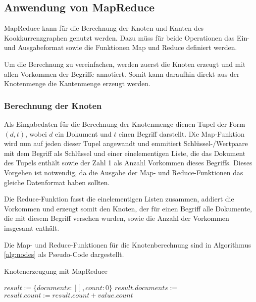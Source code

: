 \subsection{Anwendung von MapReduce}
\label{mapreduce_cooccurence}

MapReduce kann für die Berechnung der Knoten und Kanten des Kookkurrenzgraphen genutzt werden. Dazu müss für beide Operationen das Ein- und Ausgabeformat sowie die Funktionen Map und Reduce definiert werden.

Um die Berechnung zu vereinfachen, werden zuerst die Knoten erzeugt und mit allen Vorkommen der Begriffe annotiert. Somit kann daraufhin direkt aus der Knotenmenge die Kantenmenge erzeugt werden.

\subsubsection{Berechnung der Knoten}

Als Eingabedaten für die Berechnung der Knotenmenge dienen Tupel der Form \((d, t)\), wobei \(d\) ein Dokument und \(t\) einen Begriff darstellt. Die Map-Funktion wird nun auf jeden dieser Tupel angewandt und emmitiert Schlüssel-/Wertpaare mit dem Begriff als Schlüssel und einer einelementigen Liste, die das Dokument des Tupels enthält sowie der Zahl \num{1} als Anzahl Vorkommen dieses Begriffs. Dieses Vorgehen ist notwendig, da die Ausgabe der Map- und Reduce-Funktionen das gleiche Datenformat haben sollten.

Die Reduce-Funktion fasst die einelementigen Listen zusammen, addiert die Vorkommen und erzeugt somit den Knoten, der für einen Begriff alle Dokumente, die mit diesem Begriff versehen wurden, sowie die Anzahl der Vorkommen insgesamt enthält.

Die Map- und Reduce-Funktionen für die Knotenberechnung sind in Algorithmus \ref{alg:nodes} als Pseudo-Code dargestellt.

\begin{algorithm}
\caption{Knotenerzeugung mit MapReduce
    \label{alg:nodes}}
    \begin{algorithmic}[1]
            \State {}
        \EndFunction
        \Statex
            \State $result := \{documents: [], count: 0\}$
                \State $result.documents :=$ 
                \State $result.count := result.count + value.count$
            \EndFor
            \State {}
        \EndFunction
    \end{algorithmic}
\end{algorithm}

